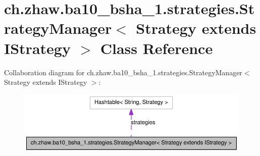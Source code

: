 \hypertarget{classch_1_1zhaw_1_1ba10__bsha__1_1_1strategies_1_1StrategyManager_3_01Strategy_01extends_01IStrategy_01_4}{
\section{ch.zhaw.ba10\_\-bsha\_\-1.strategies.StrategyManager$<$ Strategy extends IStrategy $>$ Class Reference}
\label{classch_1_1zhaw_1_1ba10__bsha__1_1_1strategies_1_1StrategyManager_3_01Strategy_01extends_01IStrategy_01_4}
}
Collaboration diagram for ch.zhaw.ba10\_\-bsha\_\-1.strategies.StrategyManager$<$ Strategy extends IStrategy $>$:\nopagebreak
\begin{figure}[H]
\begin{center}
\leavevmode
\includegraphics[width=400pt]{classch_1_1zhaw_1_1ba10__bsha__1_1_1strategies_1_1StrategyManager_3_01Strategy_01extends_01IStrategy_01_4__coll__graph}
\end{center}
\end{figure}
